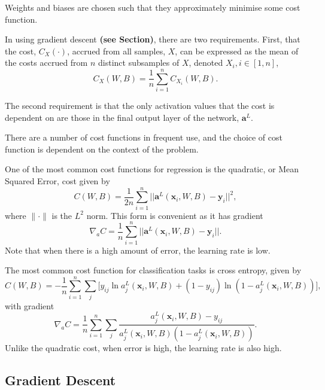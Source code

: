 \documentclass[honours,12pt]{unswthesis}
\numberwithin{equation}{section}
\begin{document}
Weights and biases are chosen such that they approximately minimise some cost function.

In using gradient descent \textbf{(see Section)}, there are two requirements. First, that the cost, $C_X(\cdot)$, accrued from all samples, $X$, can be expressed as the mean of the costs accrued from $n$ distinct subsamples of $X$, denoted $X_i, i \in[1,n]$,
\[
	C_X(W, B) = \dfrac{1}{n}\sum_{i = 1}^nC_{X_i}(W,B).
\]

The second requirement is that the only activation values that the cost is dependent on are those in the final output layer of the network, $\mathbf{a}^L$.

There are a number of cost functions in frequent use, and the choice of cost function is dependent on the context of the problem.

One of the most common cost functions for regression is the quadratic, or Mean Squared Error, cost given by
\[
	C(W,B) = \dfrac{1}{2n}\sum_{i=1}^n||\mathbf{a}^L(\mathbf{x}_i,W,B) - \mathbf{y}_i ||^2,
\]
where $\|\cdot\|$ is the $L^2$ norm. This form is convenient as it has gradient
\[
	\nabla_aC = \dfrac{1}{n}\sum_{i=1}^n||\mathbf{a}^L(\mathbf{x}_i,W,B) - \mathbf{y}_i ||.
\]
Note that when there is a high amount of error, the learning rate is low.

The most common cost function for classification tasks is cross entropy, given by
\[
	C(W,B) = -\dfrac{1}{n}\sum_{i=1}^n\sum_j\big[y_{ij}\ln a_j^L(\mathbf{x}_i,W,B) + (1 - y_{ij})\ln (1 - a_j^L(\mathbf{x}_i,W,B))\big],
\]
with gradient
\[
	\nabla_aC = \dfrac{1}{n}\sum_{i=1}^n\sum_j\dfrac{a_j^L(\mathbf{x}_i,W,B) - y_{ij}}{a_j^L(\mathbf{x}_i,W,B)(1-a_j^L(\mathbf{x}_i,W,B))}.
\]
Unlike the quadratic cost, when error is high, the learning rate is also high.


\subsection{Gradient Descent}\label{nnets-graddesc}
\end{document}
